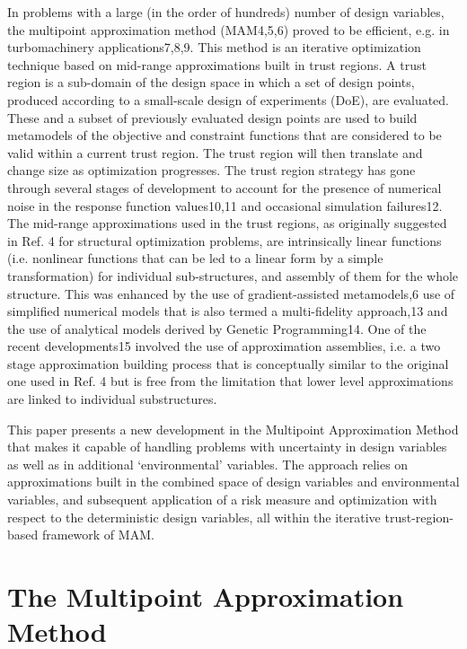 \documentclass[10pt,twocolumn,a4paper]{article}
\begin{document}
In problems with a large (in the order of hundreds) number of design variables, the multipoint approximation method (MAM4,5,6) proved to be efficient, e.g. in turbomachinery applications7,8,9. This method is an iterative optimization technique based on mid-range approximations built in trust regions. A trust region is a sub-domain of the design space in which a set of design points, produced according to a small-scale design of experiments (DoE), are evaluated. These and a subset of previously evaluated design points are used to build metamodels of the objective and constraint functions that are considered to be valid within a current trust region. The trust region will then translate and change size as optimization progresses. The trust region strategy has gone through several stages of development to account for the presence of numerical noise in the response function values10,11 and occasional simulation failures12. The mid-range approximations used in the trust regions, as originally suggested in Ref. 4 for structural optimization problems, are intrinsically linear functions (i.e. nonlinear functions that can be led to a linear form by a simple transformation) for individual sub-structures, and assembly of them for the whole structure. This was enhanced by the use of gradient-assisted metamodels,6 use of simplified numerical models that is also termed a multi-fidelity approach,13 and the use of analytical models derived by Genetic Programming14. One of the recent developments15 involved the use of approximation assemblies, i.e. a two stage approximation building process that is conceptually similar to the original one used in Ref. 4 but is free from the limitation that lower level approximations are linked to individual substructures.

This paper presents a new development in the Multipoint Approximation Method that makes it capable of handling problems with uncertainty in design variables as well as in additional ‘environmental’ variables. The approach relies on approximations built in the combined space of design variables and environmental variables, and subsequent application of a risk measure and optimization with respect to the deterministic design variables, all within the iterative trust-region-based framework of MAM.

\section{The Multipoint Approximation Method}
\end{document}
